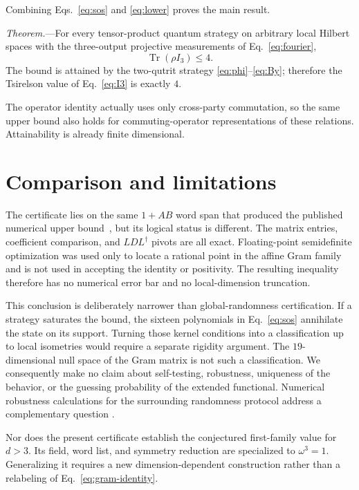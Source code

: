 \documentclass[aps,pra,reprint,superscriptaddress,nofootinbib,longbibliography]{revtex4-2}
\newcommand{\Tr}{\operatorname{Tr}}
\begin{document}
Combining Eqs.~\eqref{eq:sos} and \eqref{eq:lower} proves the main result.

\textit{Theorem.}---For every tensor-product quantum strategy on arbitrary
local Hilbert spaces with the three-output projective measurements of
Eq.~\eqref{eq:fourier},
\begin{equation}
 \Tr(\rho I_3)\leq4.
\end{equation}
The bound is attained by the two-qutrit strategy
\eqref{eq:phi}--\eqref{eq:By}; therefore the Tsirelson value of
Eq.~\eqref{eq:I3} is exactly $4$.

The operator identity actually uses only cross-party commutation, so the same
upper bound also holds for commuting-operator representations of these
relations.  Attainability is already finite dimensional.

\section{Comparison and limitations}

The certificate lies on the same $1+AB$ word span that produced the published
numerical upper bound~\cite{Perito2026}, but its logical status is different.
The matrix entries, coefficient comparison, and $LDL^\dagger$ pivots are all
exact.  Floating-point semidefinite optimization was used only to locate a
rational point in the affine Gram family and is not used in accepting the
identity or positivity.  The resulting inequality therefore has no numerical
error bar and no local-dimension truncation.

This conclusion is deliberately narrower than global-randomness certification.
If a strategy saturates the bound, the sixteen polynomials in
Eq.~\eqref{eq:sos} annihilate the state on its support.  Turning those kernel
conditions into a classification up to local isometries would require a
separate rigidity argument.  The $19$-dimensional null space of the Gram
matrix is not such a classification.  We consequently make no claim about
self-testing, robustness, uniqueness of the behavior, or the guessing
probability of the extended functional.  Numerical robustness calculations
for the surrounding randomness protocol address a complementary question
\cite{DAvino2026}.

Nor does the present certificate establish the conjectured first-family value
for $d>3$.  Its field, word list, and symmetry reduction are specialized to
$\omega^3=1$.  Generalizing it requires a new dimension-dependent construction
rather than a relabeling of Eq.~\eqref{eq:gram-identity}.
\end{document}
